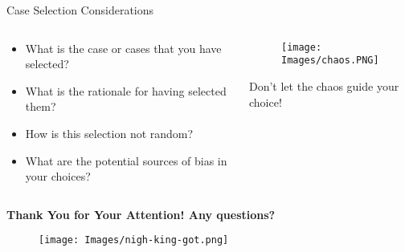 \documentclass[10pt, aspectratio=169]{beamer}
\begin{document}
\begin{frame}{Case Selection Considerations}
\begin{columns}
\begin{column}{0.5\textwidth}
\begin{itemize}
    \item What is the case or cases that you have selected? \vspace{0.3cm}
    \item What is the rationale for having selected them? \vspace{0.3cm}
    \item How is this selection not random? \vspace{0.3cm}
    \item What are the potential sources of bias in your choices? \vspace{0.3cm}
\end{itemize}
\end{column}

\begin{column}{0.5\textwidth}
\begin{figure}
    \centering
    \texttt{[image: Images/chaos.PNG]}
    \label{fig:enter-label}
\end{figure}
\begin{center}
Don't let the chaos guide your choice!
    
\end{center}
\end{column}
\end{columns}
\end{frame}



\begin{frame}[plain]
\centering
\vspace{0.6cm}
\textbf{\large Thank You for Your Attention! Any questions?}
\vspace{0.3cm}
\begin{figure}
    \centering
    \texttt{[image: Images/nigh-king-got.png]}
    \label{fig:enter-label}
\end{figure}
\end{frame}
\end{document}
